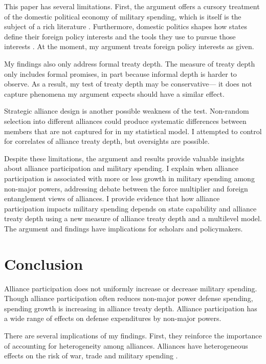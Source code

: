 \documentclass[12pt]{article}
\begin{document}
This paper has several limitations.
First, the argument offers a cursory treatment of the domestic political economy of military spending, which is itself is the subject of a rich literature \citep{WhittenWilliams2011, AlptekinLevine2012}.  
Furthermore, domestic politics shapes how states define their foreign policy interests and the tools they use to pursue those interests \citep{Fordham1998, Fordham2011, Narizny2007}. 
At the moment, my argument treats foreign policy interests as given.  


My findings also only address formal treaty depth. 
The measure of treaty depth only includes formal promises, in part because informal depth is harder to observe. 
As a result, my test of treaty depth may be conservative--- it does not capture phenomena my argument expects should have a similar effect. 


Strategic alliance design is another possible weakness of the test. 
Non-random selection into different alliances could produce systematic differences between members that are not captured for in my statistical model. 
I attempted to control for correlates of alliance treaty depth, but oversights are possible.


Despite these limitations, the argument and results provide valuable insights about alliance participation and military spending. 
I explain when alliance participation is associated with more or less growth in military spending among non-major powers, addressing debate between the force multiplier and foreign entanglement views of alliances.  
I provide evidence that how alliance participation impacts military spending depends on state capability and alliance treaty depth using a new measure of alliance treaty depth and a multilevel model. 
The argument and findings have implications for scholars and policymakers. 


\section{Conclusion}

Alliance participation does not uniformly increase or decrease military spending. 
Though alliance participation often reduces non-major power defense spending, spending growth is increasing in alliance treaty depth. 
Alliance participation has a wide range of effects on defense expenditures by non-major powers. 


There are several implications of my findings.  
First, they reinforce the importance of accounting for heterogeneity among alliances.
Alliances have heterogeneous effects on the risk of war, trade and military spending \citep{Leeds2003, LongLeeds2006, Benson2012, DigiuseppePoast2016}. 
\end{document}
